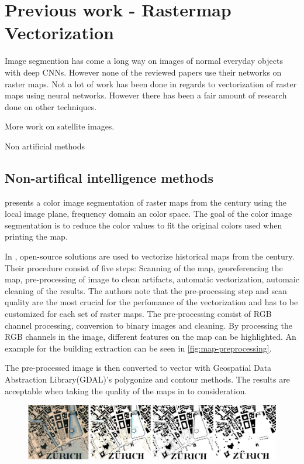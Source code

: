 \chapter{Previous work - Rastermap Vectorization}
Image segmention has come a long way on images of normal everyday objects with deep CNNs. However none of the reviewed papers use their networks on raster maps. Not a lot of work has been done in regards to vectorization of raster maps using neural networks. However there has been a fair amount of research done on other techniques.

More work on satellite images.

Non artificial methods 

\section{Non-artifical intelligence methods}

\citeauthor{Leyk2010} presents a color image segmentation of raster maps from the  century using the local image plane, frequency domain an color space. The goal of the color image segmentation is to reduce the color values to fit the original colors used when printing the map. 

In \cite{Iosifescu2016}, open-source solutions are used to vectorize historical maps from the  century. Their procedure consist of five steps: Scanning of the map, georeferencing the map, pre-processing of image to clean artifacts, automatic vectorization, automaic cleaning of the results. The authors note that the pre-processing step and scan quality are the most crucial for the perfomance of the vectorization and has to be customized for each set of raster maps. The pre-processing consist of RGB channel processing, conversion to binary images and cleaning. By processing the RGB channels in the image, different features on the map can be highlighted. An example for the building extraction can be seen in \autoref{fig:map-preprocessing}. 

The pre-processed image is then converted to vector with Geospatial Data Abstraction Library\cite{OSGeo}(GDAL)'s polygonize and contour methods. The results are acceptable when taking the quality of the maps in to consideration.

\begin{figure}[H]
	\centering
	\includegraphics[width=\linewidth]{fig/map-processing.png}
	\label{fig:map-preprocessing}
\end{figure}


